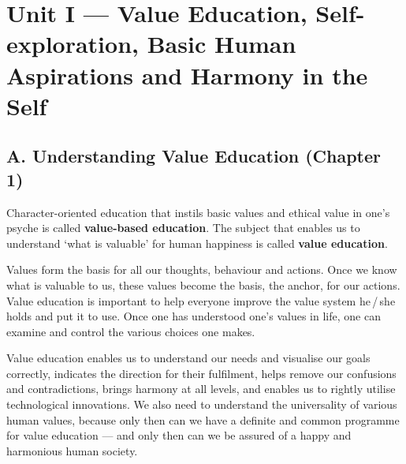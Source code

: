 \chapter{Unit I --- Value Education, Self-exploration, Basic Human
  Aspirations and Harmony in the Self}

\section{A. Understanding Value Education (Chapter 1)}


\ans Character-oriented education that instils basic values and ethical value
in one's psyche is called \textbf{value-based education}. The subject that
enables us to understand `what is valuable' for human happiness is called
\textbf{value education}.

Values form the basis for all our thoughts, behaviour and actions. Once we
know what is valuable to us, these values become the basis, the anchor, for
our actions. Value education is important to help everyone improve the value
system he\,/\,she holds and put it to use. Once one has understood one's
values in life, one can examine and control the various choices one makes.

Value education enables us to understand our needs and visualise our goals
correctly, indicates the direction for their fulfilment, helps remove our
confusions and contradictions, brings harmony at all levels, and enables us to
rightly utilise technological innovations. We also need to understand the
universality of various human values, because only then can we have a definite
and common programme for value education --- and only then can we be assured
of a happy and harmonious human society.


